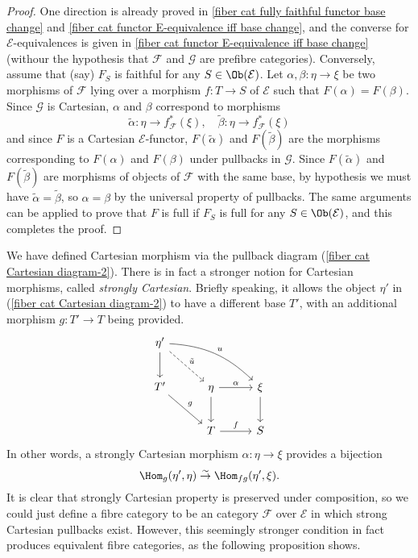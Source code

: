 \begin{proof}
One direction is already proved in \cref{fiber cat fully faithful functor base change} and \cref{fiber cat functor E-equivalence iff base change}, and the converse for $\mathcal{E}$-equivalences is given in \cref{fiber cat functor E-equivalence iff base change} (withour the hypothesis that $\mathcal{F}$ and $\mathcal{G}$ are prefibre categories). Conversely, assume that (say) $F_S$ is faithful for any $S\in\Ob(\mathcal{E})$. Let $\alpha,\beta:\eta\to \xi$ be two morphisms of $\mathcal{F}$ lying over a morphism $f:T\to S$ of $\mathcal{E}$ such that $F(\alpha)=F(\beta)$. Since $\mathcal{G}$ is Cartesian, $\alpha$ and $\beta$ correspond to morphisms
\[\tilde{\alpha}:\eta\to f^*_\mathcal{F}(\xi),\quad \tilde{\beta}:\eta\to f^*_\mathcal{F}(\xi)\]
and since $F$ is a Cartesian $\mathcal{E}$-functor, $F(\tilde{\alpha})$ and $F(\tilde{\beta})$ are the morphisms corresponding to $F(\alpha)$ and $F(\beta)$ under pullbacks in $\mathcal{G}$. Since $F(\tilde{\alpha})$ and $F(\tilde{\beta})$ are morphisms of objects of $\mathcal{F}$ with the same base, by hypothesis we must have $\tilde{\alpha}=\tilde{\beta}$, so $\alpha=\beta$ by the universal property of pullbacks. The same arguments can be applied to prove that $F$ is full if $F_S$ is full for any $S\in\Ob(\mathcal{E})$, and this completes the proof.
\end{proof}
We have defined Cartesian morphism via the pullback diagram (\ref{fiber cat Cartesian diagram-2}). There is in fact a stronger notion for Cartesian morphisms, called \textit{strongly Cartesian}. Briefly speaking, it allows the object $\eta'$ in (\ref{fiber cat Cartesian diagram-2}) to have a different base $T'$, with an additional morphism $g:T'\to T$ being provided.
\[\begin{tikzcd}[row sep=8mm,column sep=10mm]
\eta'\ar[d]\ar[rd,dashed,"\tilde{u}"]\ar[rrd,"u",bend left=20pt]\\
T'\ar[rd,"g"]&\eta\ar[r,"\alpha"]\ar[d]&\xi\ar[d]\\
&T\ar[r,"f"]&S
\end{tikzcd}\]
In other words, a strongly Cartesian morphism $\alpha:\eta\to \xi$ provides a bijection
\begin{equation}\label{fibre cat strong Cartesian bijection}
\Hom_g(\eta',\eta)\stackrel{\sim}{\to }\Hom_{fg}(\eta',\xi).
\end{equation}
It is clear that strongly Cartesian property is preserved under composition, so we could just define a fibre category to be an category $\mathcal{F}$ over $\mathcal{E}$ in which strong Cartesian pullbacks exist. However, this seemingly stronger condition in fact produces equivalent fibre categories, as the following proposition shows.
